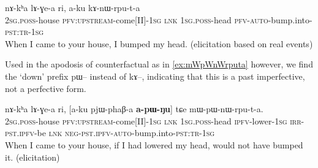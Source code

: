 \documentclass[oldfontcommands,oneside,a4paper,11pt]{article}
\newcommand{\ipa}[1]{{\phon \mbox{#1}}} %
\begin{document}
     \begin{exe}
   \ex \label{ex:kAnWrputa}
   \gll
\ipa{nɤ-kʰa}   	\ipa{lɤ-ɣe-a}   	\ipa{ri,}   	\ipa{a-ku}   	\ipa{kɤ-nɯ-rpu-t-a}   \\
\textsc{2sg.poss}-house \textsc{pfv:upstream}-come[II]-\textsc{1sg} \textsc{lnk} \textsc{1sg.poss}-head \textsc{pfv-auto}-bump.into-\textsc{pst:tr-1sg} \\
\glt  When I came to your house, I bumped my head. (elicitation based on real events)
\end{exe}

Used in the apodosis of counterfactual as in \ref{ex:mWpWnWrputa} however, we find the `down' prefix \ipa{pɯ}-- instead of \ipa{kɤ}--, indicating that this is a past imperfective, not a perfective form.

     \begin{exe}
   \ex \label{ex:mWpWnWrputa}
   \gll
\ipa{nɤ-kʰa}   	\ipa{lɤ-ɣe-a}   	\ipa{ri,}   	[\ipa{a-ku}   	\ipa{pjɯ-phaβ-a}   	\textbf{\ipa{a-pɯ-ŋu}}]   	\ipa{tɕe}   	\ipa{mɯ-pɯ-nɯ-rpu-t-a.}     \\
\textsc{2sg.poss}-house \textsc{pfv:upstream}-come[II]-\textsc{1sg} \textsc{lnk} \textsc{1sg.poss}-head \textsc{ipfv}-lower-\textsc{1sg} \textsc{irr-pst.ipfv}-be \textsc{lnk}
 \textsc{neg-pst.ipfv-auto}-bump.into-\textsc{pst:tr-1sg} \\
\glt  When I came to your house, if I had lowered my head, would not have bumped it. (elicitation)
\end{exe}



%


\end{document}
